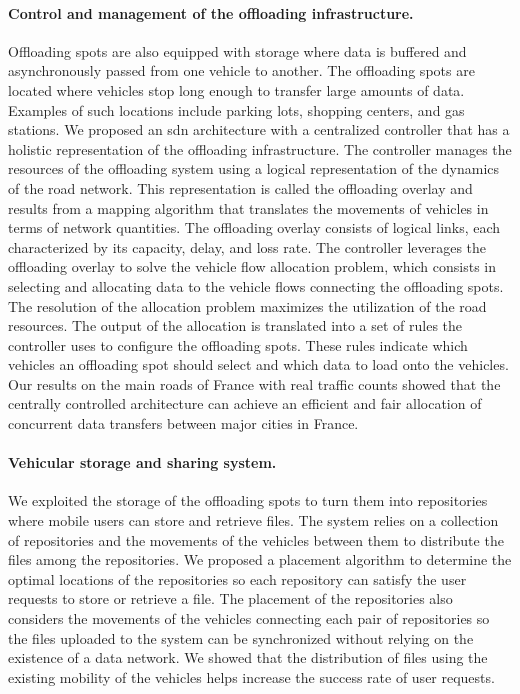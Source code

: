 \paragraph{Control and management of the offloading infrastructure.}
Offloading spots are also equipped with storage where data is buffered and asynchronously passed from one vehicle to another. The offloading spots are located where vehicles stop long enough to transfer large amounts of data. Examples of such locations include parking lots, shopping centers, and gas stations. We proposed an \acrshort{sdn} architecture with a centralized controller that has a holistic representation of the offloading infrastructure. The controller manages the resources of the offloading system using a logical representation of the dynamics of the road network. This representation is called the offloading overlay and results from a mapping algorithm that translates the movements of vehicles in terms of network quantities. The offloading overlay consists of logical links, each characterized by its capacity, delay, and loss rate. The controller leverages the offloading overlay to solve the vehicle flow allocation problem, which consists in selecting and allocating data to the vehicle flows connecting the offloading spots. The resolution of the allocation problem maximizes the utilization of the road resources. The output of the allocation is translated into a set of rules the controller uses to configure the offloading spots. These rules indicate which vehicles an offloading spot should select and which data to load onto the vehicles. Our results on the main roads of France with real traffic counts showed that the centrally controlled architecture can achieve an efficient and fair allocation of concurrent data transfers between major cities in France.

\paragraph{Vehicular storage and sharing system.}
We exploited the storage of the offloading spots to turn them into repositories where mobile users can store and retrieve files. The system relies on a collection of repositories and the movements of the vehicles between them to distribute the files among the repositories. We proposed a placement algorithm to determine the optimal locations of the repositories so each repository can satisfy the user requests to store or retrieve a file. The placement of the repositories also considers the movements of the vehicles connecting each pair of repositories so the files uploaded to the system can be synchronized without relying on the existence of a data network. We showed that the distribution of files using the existing mobility of the vehicles helps increase the success rate of user requests.

